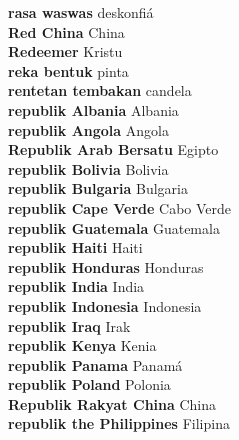 \textbf{ rasa waswas  } deskonfiá \\
\textbf{ Red China  } China \\
\textbf{ Redeemer  } Kristu \\
\textbf{ reka bentuk  } pinta \\
\textbf{ rentetan tembakan  } candela \\
\textbf{ republik Albania  } Albania \\
\textbf{ republik Angola  } Angola \\
\textbf{ Republik Arab Bersatu  } Egipto \\
\textbf{ republik Bolivia  } Bolivia \\
\textbf{ republik Bulgaria  } Bulgaria \\
\textbf{ republik Cape Verde  } Cabo Verde \\
\textbf{ republik Guatemala  } Guatemala \\
\textbf{ republik Haiti  } Haiti \\
\textbf{ republik Honduras  } Honduras \\
\textbf{ republik India  } India \\
\textbf{ republik Indonesia  } Indonesia \\
\textbf{ republik Iraq  } Irak \\
\textbf{ republik Kenya  } Kenia \\
\textbf{ republik Panama  } Panamá \\
\textbf{ republik Poland  } Polonia \\
\textbf{ Republik Rakyat China  } China \\
\textbf{ republik the Philippines  } Filipina \\
